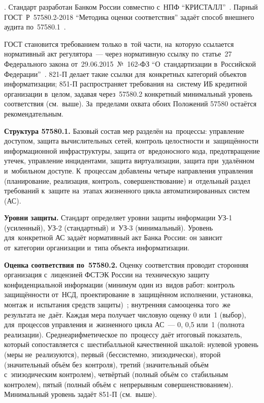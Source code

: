 . Стандарт разработан Банком России совместно с~НПФ
\enquote{КРИСТАЛЛ}~\cite{gost-57580-1}. Парный ГОСТ~Р~57580.2-2018
\enquote{Методика оценки соответствия} задаёт способ внешнего аудита
по~57580.1~\cite{gost-57580-2}.

ГОСТ становится требованием только в~той части, на~которую ссылается
нормативный акт регулятора~--- через нормативную ссылку по~статье~27
Федерального закона от~29.06.2015~№~162-ФЗ \enquote{О~стандартизации
в~Российской Федерации}~\cite{fz-162}. 821-П делает такие ссылки для~конкретных
категорий объектов информатизации; 851-П распространяет требования на~систему
ИБ кредитной организации в~целом, задавая через~57580.2 конкретный минимальный
уровень соответствия (см.~выше). За~пределами охвата
обоих Положений 57580 остаётся рекомендательным.

\textbf{Структура 57580.1.} Базовый состав мер разделён на~процессы:
управление доступом, защита вычислительных сетей, контроль целостности
и~защищённости информационной инфраструктуры, защита от~вредоносного кода,
предотвращение утечек, управление инцидентами, защита виртуализации, защита
при~удалённом и~мобильном доступе. К~процессам добавлены четыре направления
управления (планирование, реализация, контроль, совершенствование) и~отдельный
раздел требований к~защите на~этапах жизненного цикла автоматизированных
систем (АС).

\textbf{Уровни защиты.} Стандарт определяет уровни защиты информации УЗ-1
(усиленный), УЗ-2 (стандартный) и~УЗ-3 (минимальный). Уровень для~конкретной
АС задаёт нормативный акт Банка России: он зависит от~категории организации
и~типа объекта информатизации.

\textbf{Оценка соответствия по~57580.2.} Оценку соответствия проводит сторонняя
организация с~лицензией ФСТЭК России на~техническую защиту конфиденциальной
информации (минимум один из~видов работ: контроль защищённости
  от~НСД, проектирование в~защищённом исполнении, установка, монтаж
и~испытания средств защиты)~\cite{gost-57580-2}; внутренняя самооценка того~же результата
не~даёт. Каждая мера
получает числовую оценку 0 или~1 (выбор), для~процессов управления и~жизненного
цикла АС~--- 0, 0{,}5 или~1 (полнота реализации). Среднеарифметическое
по~процессу даёт итоговый показатель, который сопоставляется с~шестибалльной
качественной шкалой: нулевой уровень (меры не~реализуются), первый
(бессистемно, эпизодически), второй (значительный объём без~контроля), третий
(значительный объём с~эпизодическим контролем), четвёртый (полный объём
со~стабильным контролем), пятый (полный объём с~непрерывным
совершенствованием). Минимальный уровень задаёт 851-П (см.~выше).

